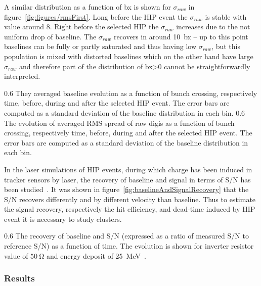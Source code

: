 A similar distribution as a function of bx is shown for $\sigma_{raw}$ in figure~\ref{fig:figures/rmsFirst}. Long before the HIP event the $\sigma_{raw}$ is stable with value around 8. Right before the selected HIP the $\sigma_{raw}$ increases due to the not uniform drop of baseline. The $\sigma_{raw}$ recovers in around 10~bx --  up to this point baselines can be fully or partly saturated and thus having low $\sigma_{raw}$, but this population is mixed with distorted baselines which on the other hand have large $\sigma_{raw}$ and therefore part of the distribution of bx>0 cannot be straightforwardly interpreted.


                 {0.6}       %
                 {They averaged baseline evolution as a function of bunch crossing, respectively time, before, during and after the selected HIP event. The error bars are computed as a standard deviation of the baseline distribution in each bin.  } %
                 {0.6}       %
                 {The evolution of averaged RMS spread of raw digis as a function of bunch crossing, respectively time, before, during and after the selected HIP event. The error bars are computed as a standard deviation of the baseline distribution in each bin.  } %


In the laser simulations of HIP events, during which charge has been induced in tracker sensors by laser, the recovery of baseline and signal in terms of S/N has been studied~\cite{Adam:2005pz}. It was shown in figure~\ref{fig:baselineAndSignalRecovery} that the S/N recovers differently and by different velocity than baseline. Thus to estimate the signal recovery, respectively the hit efficiency, and dead-time induced by HIP event it is necessary to study clusters.

                 {0.6}       %
                 {The recovery of baseline and S/N (expressed as a ratio of measured S/N to reference S/N) as a function of time. The evolution is shown for inverter resistor value of $50~\mathrm{\Omega}$ and energy deposit of 25~MeV~\cite{Adam:2005pz}.} %

\subsubsection{Results}

